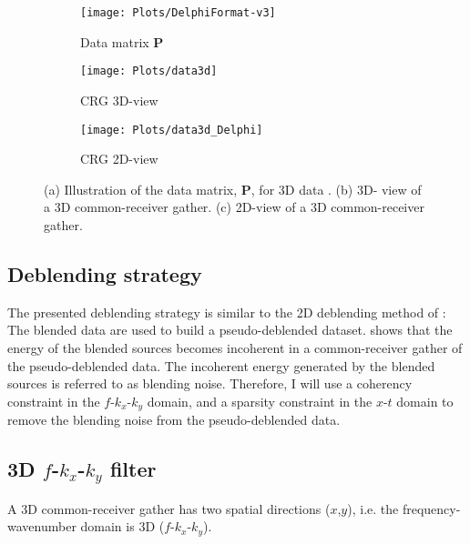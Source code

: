 \documentclass{madrid15WS}
\begin{document}
\begin{figure}[h!]
	
	\centering
	\begin{subfigure}[t]{0.4\textwidth}
		\centering
		\texttt{[image: Plots/DelphiFormat-v3]}
		\caption{Data matrix $\mathbf{P}$}
		\label{fig:DelphiFormat}
	\end{subfigure}
	\qquad  
	\centering
	\begin{subfigure}[t]{0.3\textwidth}
		\centering
		\texttt{[image: Plots/data3d]}
		\caption{CRG 3D-view}
		\label{fig:CRG_3D-view}
	\end{subfigure}
	
	\centering
	\begin{subfigure}[t]{0.8\textwidth}
		\centering
		\texttt{[image: Plots/data3d\_Delphi]}
		\caption{CRG 2D-view}
		\label{fig:CRG_2D-view}
	\end{subfigure}
	
	\caption{(a) Illustration of the data matrix, $\mathbf{P}$, for 3D data \citep{Delphi-Format}. (b) 3D- view of a 3D common-receiver gather. (c) 2D-view of a 3D common-receiver gather.}
	\label{fig:DataSorting}
\end{figure}


\subsection{Deblending strategy}

The presented deblending strategy is similar to the 2D deblending method of \citet{Mahdad-Deblending-Method}: The blended data are used to build a pseudo-deblended dataset. \citet{Mahdad-Deblending-Method} shows that the energy of the blended sources becomes incoherent in a common-receiver gather of the pseudo-deblended data. The incoherent energy generated by the blended sources is referred to as blending noise. Therefore, I will use a coherency constraint in the $f$-$k_x$-$k_y$ domain, and a sparsity constraint in the $x$-$t$ domain to remove the blending noise from the pseudo-deblended data.

\subsection{3D $f$-$k_x$-$k_y$ filter}

A 3D common-receiver gather has two spatial directions ($x$,$y$), i.e. the frequency-wavenumber domain is 3D ($f$-$k_x$-$k_y$).
\end{document}
